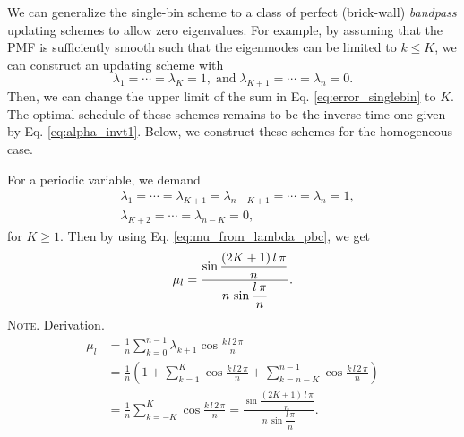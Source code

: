\documentclass[reprint, floatfix]{revtex4-1}
\newcommand{\note}[1]{{\color{DarkGreen}\footnotesize \textsc{Note.} #1}}
\begin{document}
We can generalize
the single-bin scheme to a class of
perfect (brick-wall) \emph{bandpass} updating schemes
to allow zero eigenvalues.
%
For example,
by assuming
that the PMF is sufficiently smooth
such that the eigenmodes can be limited to $k \le K$,
%
we can construct an updating scheme with
$$
\lambda_1 = \cdots = \lambda_K = 1,
\mathrm{\; and \;}
\lambda_{K+1} = \cdots = \lambda_n = 0.
$$
%
Then,
we can change the upper limit of the sum in
Eq. \eqref{eq:error_singlebin} to $K$.
%
%
The optimal schedule of these schemes
remains to be the inverse-time one
given by Eq. \eqref{eq:alpha_invt1}.
%
Below, we construct these schemes for
the homogeneous case.

For a periodic variable, we demand
%
$$
\begin{aligned}
&
\lambda_1 = \cdots = \lambda_{K+1}
= \lambda_{n-K+1} = \cdots = \lambda_n = 1,
\\
&
\lambda_{K+2} = \cdots = \lambda_{n-K} = 0,
\end{aligned}
$$
for $K \ge 1$.
%
Then by using
Eq. \eqref{eq:mu_from_lambda_pbc},
we get
\begin{equation}
  \mu_l
  =
  \frac{
    \sin
    \dfrac{ (2 K + 1) \, l \, \pi }
         {              n        }
  }
  {
    n \, \sin \dfrac{ l \, \pi } { n }
  }
  .
\notag
\end{equation}
\note{Derivation.
$$
\begin{aligned}
\mu_l
&=
\frac 1 n \sum_{k = 0}^{n-1} \lambda_{k+1} \cos \frac{ k \, l \, 2 \, \pi } { n }
\\
&=
\frac{1}{n}
\left(
  1 +
  \sum_{k=1}^K
  \cos \frac { k \, l \, 2 \, \pi } { n }
  +
  \sum_{k=n-K}^{n-1}
  \cos \frac { k \, l \, 2 \, \pi } { n }
\right)
\\
&=
\frac 1 n
\sum_{k=-K}^K
\cos \frac { k \, l \, 2 \, \pi } { n }
=
  \frac{
    \sin
    \dfrac{ (2 K + 1) \, l \, \pi }
         {              n        }
  }
  {
    n \, \sin \dfrac{ l \, \pi } { n }
  }
.
\end{aligned}
$$
}
\end{document}
